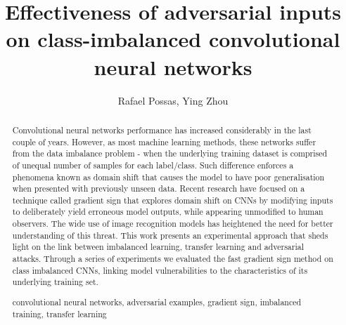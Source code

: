 \documentclass[runningheads,a4paper]{llncs}
\newcommand{\keywords}[1]{\par\addvspace\baselineskip
\noindent\keywordname\enspace\ignorespaces#1}
\begin{document}
\mainmatter  %

\title{Effectiveness of adversarial inputs on class-imbalanced convolutional neural networks}

%
%
\author{Rafael Possas, Ying Zhou}
%


%
%

\maketitle


\begin{abstract}
Convolutional neural networks performance has increased considerably in the last couple of years. However, as most machine learning methods, these networks suffer from the data imbalance problem - when the underlying training dataset is comprised of unequal number of samples for each label/class. Such difference enforces a phenomena known as domain shift that causes the model to have poor generalisation when presented with previously unseen data. Recent research have focused on a technique called gradient sign that explores domain shift on CNNs by modifying inputs to deliberately yield erroneous model outputs, while appearing unmodified to human observers. The wide use of image recognition models has heightened the need for better understanding of this threat. This work presents an experimental approach that sheds light on the link between imbalanced learning, transfer learning and adversarial attacks. Through a series of experiments we evaluated the fast gradient sign method on class imbalanced CNNs, linking model vulnerabilities to the characteristics of its underlying training set.
\keywords{convolutional neural networks, adversarial examples, gradient sign, imbalanced training, transfer learning}
\end{abstract}
\end{document}
